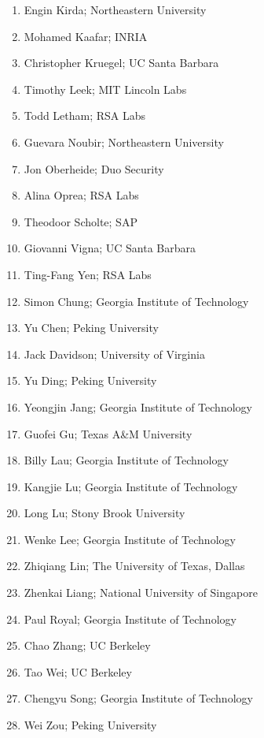 \documentclass[letterpaper,11pt]{scrartcl}
\begin{document}
\begin{enumerate}
    \item Engin Kirda; Northeastern University
    \item Mohamed Kaafar; INRIA
    \item Christopher Kruegel; UC Santa Barbara
    \item Timothy Leek; MIT Lincoln Labs
    \item Todd Letham; RSA Labs
    \item Guevara Noubir; Northeastern University
    \item Jon Oberheide; Duo Security
    \item Alina Oprea; RSA Labs
    \item Theodoor Scholte; SAP
    \item Giovanni Vigna; UC Santa Barbara
    \item Ting-Fang Yen; RSA Labs
    \item Simon Chung; Georgia Institute of Technology
    \item Yu Chen; Peking University
    \item Jack Davidson; University of Virginia
    \item Yu Ding; Peking University
    \item Yeongjin Jang; Georgia Institute of Technology
    \item Guofei Gu; Texas A\&M University
    \item Billy Lau; Georgia Institute of Technology
    \item Kangjie Lu; Georgia Institute of Technology
    \item Long Lu; Stony Brook University
    \item Wenke Lee; Georgia Institute of Technology
    \item Zhiqiang Lin; The University of Texas, Dallas
    \item Zhenkai Liang; National University of Singapore
    \item Paul Royal; Georgia Institute of Technology
    \item Chao Zhang; UC Berkeley
    \item Tao Wei; UC Berkeley
    \item Chengyu Song; Georgia Institute of Technology
    \item Wei Zou; Peking University
\end{enumerate}
\end{document}
